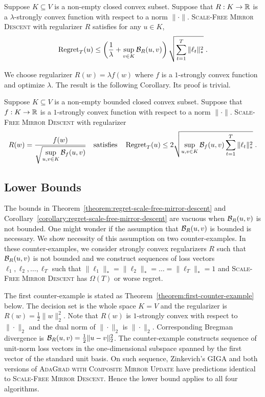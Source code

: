 \begin{theorem}
\label{theorem:regret-scale-free-mirror-descent}
Suppose $K \subseteq V$ is a non-empty closed convex subset. Suppose that $R:K
\to \mathbb{R}$ is a $\lambda$-strongly convex function with respect to a norm
$\|\cdot\|$.  \textsc{Scale-Free Mirror Descent} with regularizer $R$ satisfies
for any $u \in K$,
$$
\operatorname{Regret}_T(u) \le \left( \frac{1}{\lambda} + \sup_{v \in K} \mathcal{B}_R(u,v) \right) \sqrt{\sum_{t=1}^T \|\ell_t\|_*^2} \; .
$$
\end{theorem}

We choose regularizer $R(w) = \lambda f(w)$ where $f$ is a $1$-strongly convex
function and optimize $\lambda$. The result is the following Corollary. Its proof is trivial.

\begin{corollary}
\label{corollary:regret-scale-free-mirror-descent}
Suppose $K \subseteq V$ is a non-empty bounded closed convex subset.  Suppose
that $f:K \to \mathbb{R}$ is a $1$-strongly convex function with respect to a norm
$\|\cdot\|$.  \textsc{Scale-Free Mirror Descent} with regularizer
$$
R(w) = \frac{f(w)}{\displaystyle \sqrt{\sup_{u,v \in K} \Breg_f(u,v)}}
\quad \text{satisfies} \quad %
\Regret_T(u) \le 2 \sqrt{\sup_{u,v \in K} \Breg_f(u,v) \sum_{t=1}^T \|\ell_t\|_*^2} \; .
$$
\end{corollary}

\subsection{Lower Bounds}

The bounds in Theorem~\ref{theorem:regret-scale-free-mirror-descent} and
Corollary~\ref{corollary:regret-scale-free-mirror-descent} are vacuous when
$\mathcal{B}_R(u,v)$ is not bounded. One might wonder if the assumption that
$\mathcal{B}_R(u,v)$ is bounded is necessary. We show necessity of this assumption on
two counter-examples.  In these
counter-examples, we consider strongly convex regularizers $R$ such that
$\mathcal{B}_R(u,v)$ is not bounded and we construct sequences of loss vectors
$\ell_1, \ell_2, \dots, \ell_T$ such that $\|\ell_1\|_* = \|\ell_2\|_* = \dots
= \|\ell_T\|_* = 1$ and \textsc{Scale-Free Mirror Descent} has $\Omega(T)$ or
worse regret.

The first counter-example is stated as
Theorem~\ref{theorem:first-counter-example} below. The decision set is the
whole space $K=V$ and the regularizer is $R(w) = \frac{1}{2}\|w\|_2^2$. Note
that $R(w)$ is $1$-strongly convex with respect to $\|\cdot\|_2$ and the dual
norm of $\|\cdot\|_2$ is $\|\cdot\|_2$. Corresponding Bregman divergence is
$\mathcal{B}_R(u,v) = \frac{1}{2}\|u-v\|_2^2$. The counter-example constructs
sequence of unit-norm loss vectors in the one-dimensional subspace spanned by
the first vector of the standard unit basis.  On such sequence, Zinkevich's
\textsc{GIGA} and both versions of \textsc{AdaGrad with Composite Mirror
Update} have predictions identical to \textsc{Scale-Free Mirror Descent}. Hence
the lower bound applies to all four algorithms.

